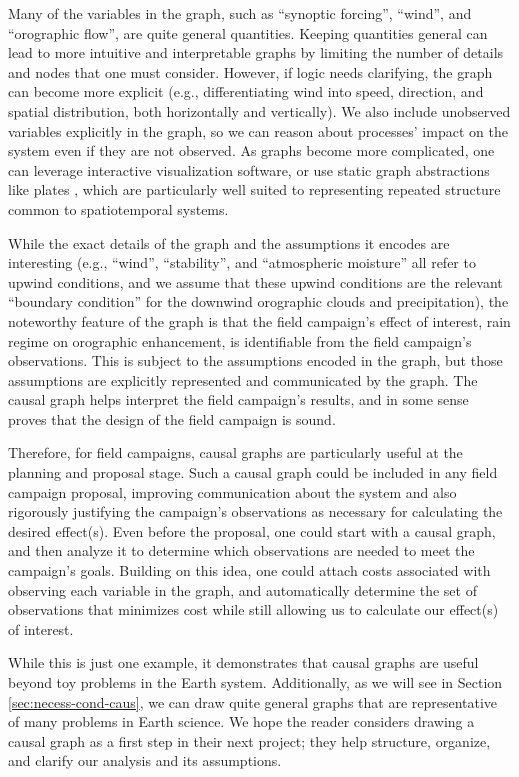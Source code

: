 \documentclass[12pt]{article}
\begin{document}
Many of the variables in the graph, such as ``synoptic forcing'',
``wind'', and ``orographic flow'', are quite general
quantities. Keeping quantities general can lead to more intuitive and
interpretable graphs by limiting the number of details and nodes that
one must consider. However, if logic needs clarifying, the graph can
become more explicit (e.g., differentiating wind into speed,
direction, and spatial distribution, both horizontally and
vertically). We also include unobserved variables explicitly in the
graph, so we can reason about processes' impact on the system even if
they are not observed. As graphs become more complicated, one can
leverage interactive visualization software, or use static graph
abstractions like plates \citep{bishop2006pattern}, which are
particularly well suited to representing repeated structure common to
spatiotemporal systems.

While the exact details of the graph and the assumptions it encodes
are interesting (e.g., ``wind'', ``stability'', and ``atmospheric
moisture'' all refer to upwind conditions, and we assume that these
upwind conditions are the relevant ``boundary condition'' for the
downwind orographic clouds and precipitation), the noteworthy feature
of the graph is that the field campaign's effect of interest, rain
regime on orographic enhancement, is identifiable from the field
campaign's observations. This is subject to the assumptions encoded in
the graph, but those assumptions are explicitly represented and
communicated by the graph. The causal graph helps interpret the field
campaign's results, and in some sense proves that the design of the
field campaign is sound.

Therefore, for field campaigns, causal graphs are particularly useful at the
planning and proposal stage. Such a causal graph could be included in
any field campaign proposal, improving communication about the system
and also rigorously justifying the campaign’s observations as
necessary for calculating the desired effect(s). Even before the
proposal, one could start with a causal graph, and then analyze it to
determine which observations are needed to meet the campaign’s
goals. Building on this idea, one could attach costs associated with
observing each variable in the graph, and automatically determine the
set of observations that minimizes cost while still allowing us to
calculate our effect(s) of interest.

While this is just one example, it demonstrates that causal graphs are
useful beyond toy problems in the Earth system. Additionally, as we
will see in Section \ref{sec:necess-cond-caus}, we can draw quite
general graphs that are representative of many problems in Earth
science. We hope the reader considers drawing a causal graph as a
first step in their next project; they help structure, organize, and
clarify our analysis and its assumptions.
\end{document}
